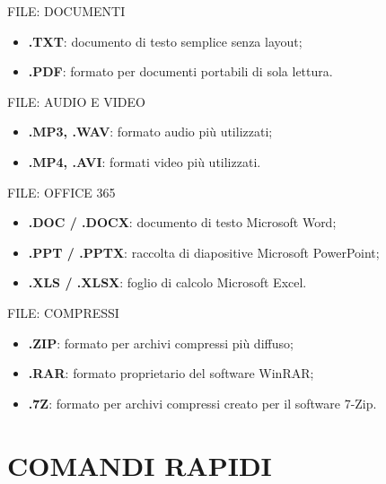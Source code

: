 \documentclass[aspectratio=1610]{beamer}
\begin{document}
\begin{frame}{FILE: DOCUMENTI}
    \begin{itemize}
        \item \textbf{.TXT}: documento di testo semplice senza layout;
        \pause
        \item \textbf{.PDF}: formato per documenti portabili di sola lettura.
    \end{itemize}
\end{frame}

\begin{frame}{FILE: AUDIO E VIDEO}
    \begin{itemize}
        \item \textbf{.MP3, .WAV}: formato audio più utilizzati;
        \pause
        \item \textbf{.MP4, .AVI}: formati video più utilizzati.
    \end{itemize}
\end{frame}

\begin{frame}{FILE: OFFICE 365}
    \begin{itemize}
        \item \textbf{.DOC / .DOCX}: documento di testo Microsoft Word;
        \pause
        \item \textbf{.PPT / .PPTX}: raccolta di diapositive Microsoft PowerPoint;
        \pause
        \item \textbf{.XLS / .XLSX}: foglio di calcolo Microsoft Excel.
    \end{itemize}
\end{frame}

\begin{frame}{FILE: COMPRESSI}
    \begin{itemize}
        \item \textbf{.ZIP}: formato per archivi compressi più diffuso;
        \pause
        \item \textbf{.RAR}: formato proprietario del software WinRAR;
        \pause
        \item \textbf{.7Z}: formato per archivi compressi creato per il software 7-Zip.
    \end{itemize}
\end{frame}

\section{COMANDI RAPIDI}
\end{document}
